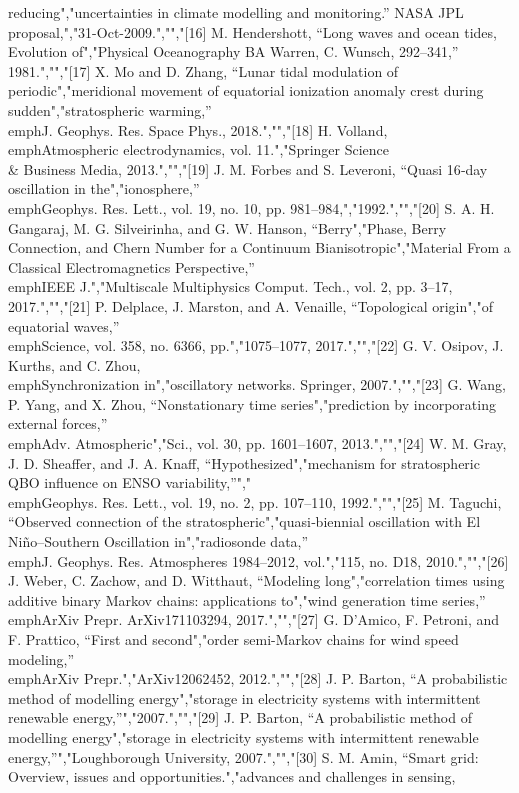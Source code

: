 {{{{{{{reducing","uncertainties in climate modelling and monitoring.'' NASA JPL proposal,","31-Oct-2009.","","{[}16{]} M. Hendershott, ``Long waves and ocean tides, Evolution of","Physical Oceanography BA Warren, C. Wunsch, 292--341,'' 1981.","","{[}17{]} X. Mo and D. Zhang, ``Lunar tidal modulation of periodic","meridional movement of equatorial ionization anomaly crest during sudden","stratospheric warming,'' \\emph{J. Geophys. Res. Space Phys.}, 2018.","","{[}18{]} H. Volland, \\emph{Atmospheric electrodynamics}, vol. 11.","Springer Science \\& Business Media, 2013.","","{[}19{]} J. M. Forbes and S. Leveroni, ``Quasi 16‐day oscillation in the","ionosphere,'' \\emph{Geophys. Res. Lett.}, vol. 19, no. 10, pp. 981--984,","1992.","","{[}20{]} S. A. H. Gangaraj, M. G. Silveirinha, and G. W. Hanson, ``Berry","Phase, Berry Connection, and Chern Number for a Continuum Bianisotropic","Material From a Classical Electromagnetics Perspective,'' \\emph{IEEE J.","Multiscale Multiphysics Comput. Tech.}, vol. 2, pp. 3--17, 2017.","","{[}21{]} P. Delplace, J. Marston, and A. Venaille, ``Topological origin","of equatorial waves,'' \\emph{Science}, vol. 358, no. 6366, pp.","1075--1077, 2017.","","{[}22{]} G. V. Osipov, J. Kurths, and C. Zhou, \\emph{Synchronization in","oscillatory networks}. Springer, 2007.","","{[}23{]} G. Wang, P. Yang, and X. Zhou, ``Nonstationary time series","prediction by incorporating external forces,'' \\emph{Adv. Atmospheric","Sci.}, vol. 30, pp. 1601--1607, 2013.","","{[}24{]} W. M. Gray, J. D. Sheaffer, and J. A. Knaff, ``Hypothesized","mechanism for stratospheric QBO influence on ENSO variability,''","\\emph{Geophys. Res. Lett.}, vol. 19, no. 2, pp. 107--110, 1992.","","{[}25{]} M. Taguchi, ``Observed connection of the stratospheric","quasi‐biennial oscillation with El Niño--Southern Oscillation in","radiosonde data,'' \\emph{J. Geophys. Res. Atmospheres 1984--2012}, vol.","115, no. D18, 2010.","","{[}26{]} J. Weber, C. Zachow, and D. Witthaut, ``Modeling long","correlation times using additive binary Markov chains: applications to","wind generation time series,'' \\emph{ArXiv Prepr. ArXiv171103294}, 2017.","","{[}27{]} G. D'Amico, F. Petroni, and F. Prattico, ``First and second","order semi-Markov chains for wind speed modeling,'' \\emph{ArXiv Prepr.","ArXiv12062452}, 2012.","","{[}28{]} J. P. Barton, ``A probabilistic method of modelling energy","storage in electricity systems with intermittent renewable energy,''","2007.","","{[}29{]} J. P. Barton, ``A probabilistic method of modelling energy","storage in electricity systems with intermittent renewable energy,''","Loughborough University, 2007.","","{[}30{]} S. M. Amin, ``Smart grid: Overview, issues and opportunities.","advances and challenges in sensing, }}}}}}}
